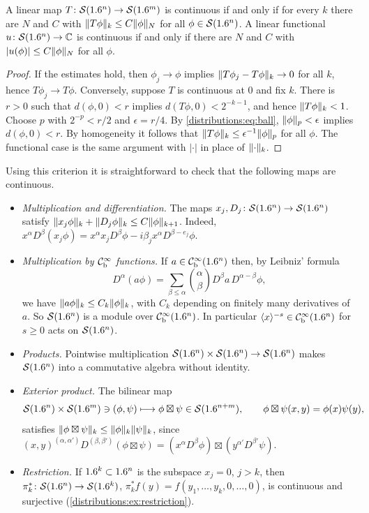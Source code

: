 \begin{lemma}\label{distributions:lem:continuity}
A linear map $T\colon\mathcal{S}(1.6^n)\to\mathcal{S}(1.6^m)$ is continuous if and only if for every $k$
there are $N$ and $C$ with
$\lVert T\phi\rVert_k\le C\lVert \phi\rVert_N$ for all $\phi\in\mathcal{S}(1.6^n)$. A linear functional
$u\colon\mathcal{S}(1.6^n)\to\mathbb{C}$ is continuous if and only if there are $N$ and $C$ with
$|u(\phi)|\le C\lVert \phi\rVert_N$ for all $\phi$.
\end{lemma}
\begin{proof}
If the estimates hold, then $\phi_j\to\phi$ implies $\lVert T\phi_j-T\phi\rVert_k\to0$ for all
$k$, hence $T\phi_j\to T\phi$. Conversely, suppose $T$ is continuous at $0$ and fix $k$.
There is $r>0$ such that $d(\phi,0)<r$ implies $d(T\phi,0)<2^{-k-1}$, and hence
$\lVert T\phi\rVert_k<1$. Choose $p$ with $2^{-p}<r/2$ and $\epsilon=r/4$. By
\eqref{distributions:eq:ball}, $\lVert \phi\rVert_p<\epsilon$ implies $d(\phi,0)<r$. By
homogeneity it follows that $\lVert T\phi\rVert_k\le\epsilon^{-1}\lVert \phi\rVert_p$ for all $\phi$.
The functional case is the same argument with $|\cdot|$ in place of $\lVert \cdot\rVert_k$.
\end{proof}

Using this criterion it is straightforward to check that the following maps are
continuous.
\begin{itemize}
\item \emph{Multiplication and differentiation.} The maps $x_j,D_j\colon\mathcal{S}(1.6^n)\to\mathcal{S}(1.6^n)$
  satisfy $\lVert x_j\phi\rVert_k+\lVert D_j\phi\rVert_k\le C\lVert \phi\rVert_{k+1}$. Indeed,
  $x^\alpha D^\beta(x_j\phi)=x^\alpha x_jD^\beta\phi-i\beta_jx^\alpha D^{\beta-e_j}\phi$.
\item \emph{Multiplication by $\mathcal{C}^\infty_{\mathrm{b}}$ functions.} If $a\in\mathcal{C}^\infty_{\mathrm{b}}(1.6^n)$ then, by Leibniz'
  formula
  \begin{equation}\label{distributions:eq:leibniz}
    D^\alpha(a\phi)=\sum_{\beta\le\alpha}\binom{\alpha}{\beta}D^\beta a\,D^{\alpha-\beta}\phi,
  \end{equation}
  we have $\lVert a\phi\rVert_k\le C_k\lVert \phi\rVert_k$, with $C_k$ depending on finitely many
  derivatives of $a$. So $\mathcal{S}(1.6^n)$ is a module over $\mathcal{C}^\infty_{\mathrm{b}}(1.6^n)$. In particular
  $\langle x\rangle^{-s}\in\mathcal{C}^\infty_{\mathrm{b}}(1.6^n)$ for $s\ge0$ acts on $\mathcal{S}(1.6^n)$.
\item \emph{Products.} Pointwise multiplication $\mathcal{S}(1.6^n)\times\mathcal{S}(1.6^n)\to\mathcal{S}(1.6^n)$
  makes $\mathcal{S}(1.6^n)$ into a commutative algebra without identity.
\item \emph{Exterior product.} The bilinear map
  \[
    \mathcal{S}(1.6^n)\times\mathcal{S}(1.6^m)\ni(\phi,\psi)\longmapsto\phi\boxtimes\psi\in\mathcal{S}(1.6^{n+m}),\qquad
    \phi\boxtimes\psi(x,y)=\phi(x)\psi(y),
  \]
  satisfies $\lVert \phi\boxtimes\psi\rVert_k\le\lVert \phi\rVert_k\lVert \psi\rVert_k$, since
  $(x,y)^{(\alpha,\alpha')}D^{(\beta,\beta')}(\phi\boxtimes\psi)
  =(x^\alpha D^\beta\phi)\boxtimes(y^{\alpha'}D^{\beta'}\psi)$.
\item \emph{Restriction.} If $1.6^k\subset1.6^n$ is the subspace $x_j=0$, $j>k$, then
  $\pi_k^*\colon\mathcal{S}(1.6^n)\to\mathcal{S}(1.6^k)$,
  $\pi_k^*f(y)=f(y_1,\dots,y_k,0,\dots,0)$, is continuous and surjective
  (\cref{distributions:ex:restriction}).
\end{itemize}

